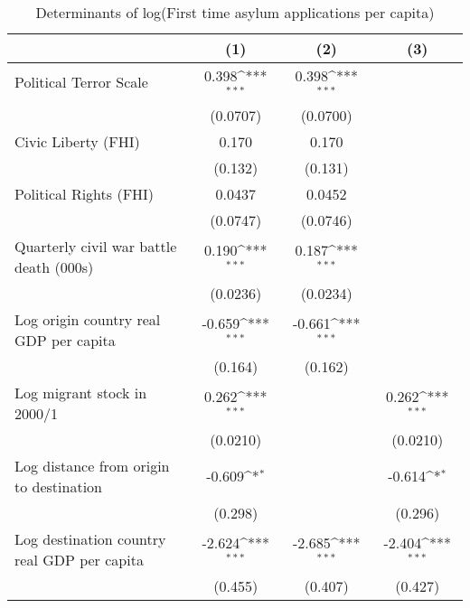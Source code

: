 \begin{table}[htbp]\centering
\def\sym#1{\ifmmode^{#1}\else\(^{#1}\)\fi}
\caption{Determinants of log(First time asylum applications per capita)}
\begin{tabular}{l*{3}{c}}
\hline\hline
                    &\multicolumn{1}{c}{(1)}         &\multicolumn{1}{c}{(2)}         &\multicolumn{1}{c}{(3)}         \\
\hline
Political Terror Scale&       0.398\sym{***}&       0.398\sym{***}&                     \\
                    &    (0.0707)         &    (0.0700)         &                     \\
[1em]
Civic Liberty (FHI) &       0.170         &       0.170         &                     \\
                    &     (0.132)         &     (0.131)         &                     \\
[1em]
Political Rights (FHI)&      0.0437         &      0.0452         &                     \\
                    &    (0.0747)         &    (0.0746)         &                     \\
[1em]
Quarterly civil war battle death (000s)&       0.190\sym{***}&       0.187\sym{***}&                     \\
                    &    (0.0236)         &    (0.0234)         &                     \\
[1em]
Log origin country real GDP per capita&      -0.659\sym{***}&      -0.661\sym{***}&                     \\
                    &     (0.164)         &     (0.162)         &                     \\
[1em]
Log migrant stock in 2000/1&       0.262\sym{***}&                     &       0.262\sym{***}\\
                    &    (0.0210)         &                     &    (0.0210)         \\
[1em]
Log distance from origin to destination&      -0.609\sym{*}  &                     &      -0.614\sym{*}  \\
                    &     (0.298)         &                     &     (0.296)         \\
[1em]
Log destination country real GDP per capita&      -2.624\sym{***}&      -2.685\sym{***}&      -2.404\sym{***}\\
                    &     (0.455)         &     (0.407)         &     (0.427)         \\

\end{tabular}
\end{table}
